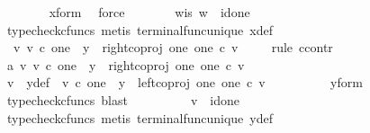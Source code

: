 \begin{isabellebody}
\ \ \ \ \ \ \isamarkupfalse%
\ x{\isacharunderscore}{\kern0pt}form\ \isamarkupfalse%
\ force\isanewline
\ \ \ \ \isamarkupfalse%
\ \isamarkupfalse%
\ w{\isacharunderscore}{\kern0pt}is{\isacharcolon}{\kern0pt}\ {\isachardoublequoteopen}w\ {\isacharequal}{\kern0pt}\ id{\isacharparenleft}{\kern0pt}one{\isacharparenright}{\kern0pt}{\isachardoublequoteclose}\isanewline
\ \ \ \ \ \ \isamarkupfalse%
\ {\isacharparenleft}{\kern0pt}typecheck{\isacharunderscore}{\kern0pt}cfuncs{\isacharcomma}{\kern0pt}\ metis\ terminal{\isacharunderscore}{\kern0pt}func{\isacharunderscore}{\kern0pt}unique\ x{\isacharunderscore}{\kern0pt}def{\isacharparenright}{\kern0pt}\isanewline
\ \ \ \ \isamarkupfalse%
\ {\isachardoublequoteopen}{\isasymexists}\ v{\isachardot}{\kern0pt}\ v\ {\isasymin}\isactrlsub c\ one\ {\isasymand}\ y\ {\isacharequal}{\kern0pt}\ right{\isacharunderscore}{\kern0pt}coproj\ one\ one\ {\isasymcirc}\isactrlsub c\ v{\isachardoublequoteclose}\isanewline
\ \ \ \ \isamarkupfalse%
{\isacharparenleft}{\kern0pt}rule\ ccontr{\isacharparenright}{\kern0pt}\isanewline
\ \ \ \ \ \ \isamarkupfalse%
\ a{}{\isacharcolon}{\kern0pt}\ {\isachardoublequoteopen}{\isasymnexists}v{\isachardot}{\kern0pt}\ v\ {\isasymin}\isactrlsub c\ one\ {\isasymand}\ y\ {\isacharequal}{\kern0pt}\ right{\isacharunderscore}{\kern0pt}coproj\ one\ one\ {\isasymcirc}\isactrlsub c\ v{\isachardoublequoteclose}\isanewline
\ \ \ \ \ \ \isamarkupfalse%
\ \isamarkupfalse%
\ v\ \ y{\isacharunderscore}{\kern0pt}def{\isacharcolon}{\kern0pt}\ \ {\isachardoublequoteopen}v\ {\isasymin}\isactrlsub c\ one\ {\isasymand}\ y\ {\isacharequal}{\kern0pt}\ left{\isacharunderscore}{\kern0pt}coproj\ one\ one\ {\isasymcirc}\isactrlsub c\ v{\isachardoublequoteclose}\isanewline
\ \ \ \ \ \ \ \ \isamarkupfalse%
\ y{\isacharunderscore}{\kern0pt}form\ \isamarkupfalse%
\ {\isacharparenleft}{\kern0pt}typecheck{\isacharunderscore}{\kern0pt}cfuncs{\isacharcomma}{\kern0pt}\ blast{\isacharparenright}{\kern0pt}\isanewline
\ \ \ \ \ \ \isamarkupfalse%
\ \isamarkupfalse%
\ {\isachardoublequoteopen}v\ {\isacharequal}{\kern0pt}\ id{\isacharparenleft}{\kern0pt}one{\isacharparenright}{\kern0pt}{\isachardoublequoteclose}\isanewline
\ \ \ \ \ \ \ \ \isamarkupfalse%
\ {\isacharparenleft}{\kern0pt}typecheck{\isacharunderscore}{\kern0pt}cfuncs{\isacharcomma}{\kern0pt}\ metis\ terminal{\isacharunderscore}{\kern0pt}func{\isacharunderscore}{\kern0pt}unique\ y{\isacharunderscore}{\kern0pt}def{\isacharparenright}{\kern0pt}\isanewline

\end{isabellebody}

